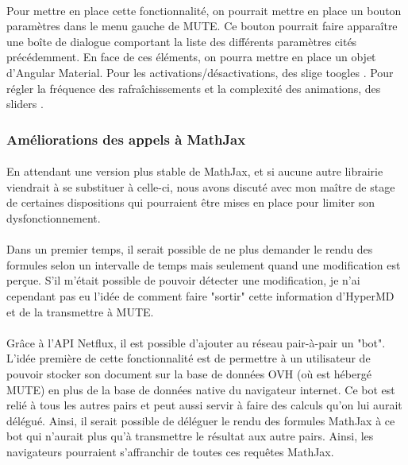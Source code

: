 \documentclass[12pt]{article}
\begin{document}
\paragraph{}
Pour mettre en place cette fonctionnalité, on pourrait mettre en place un bouton paramètres dans le menu gauche de MUTE. Ce bouton pourrait faire apparaître une boîte de dialogue comportant la liste des différents paramètres cités précédemment. En face de ces éléments, on pourra mettre en place un objet d'Angular Material. Pour les activations/désactivations, des slige toogles \cite{slide}. Pour régler la fréquence des rafraîchissements et la complexité des animations, des sliders \cite{slider}.\\

\subsubsection{Améliorations des appels à MathJax}
\paragraph{}
En attendant une version plus stable de MathJax, et si aucune autre librairie viendrait à se substituer à celle-ci, nous avons discuté avec mon maître de stage de certaines dispositions qui pourraient être mises en place pour limiter son dysfonctionnement.
\paragraph{}
Dans un premier temps, il serait possible de ne plus demander le rendu des formules selon un intervalle de temps mais seulement quand une modification est perçue. S'il m'était possible de pouvoir détecter une modification, je n'ai cependant pas eu l'idée de comment faire "sortir" cette information d'HyperMD et de la transmettre à MUTE.
\paragraph{}
Grâce à l'API Netflux, il est possible d'ajouter au réseau pair-à-pair un "bot". L'idée première de cette fonctionnalité est de permettre à un utilisateur de pouvoir stocker son document sur la base de données OVH (où est hébergé MUTE) en plus de la base de données native du navigateur internet. Ce bot est relié à tous les autres pairs et peut aussi servir à faire des calculs qu'on lui aurait délégué. Ainsi, il serait possible de déléguer le rendu des formules MathJax à ce bot qui n'aurait plus qu'à transmettre le résultat aux autre pairs. Ainsi, les navigateurs pourraient s'affranchir de toutes ces requêtes MathJax.
\end{document}
